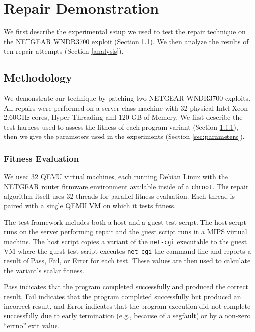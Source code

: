 \documentclass{sigcomm-alternate}
\begin{document}
{\section{Repair Demonstration}
\label{repair-demonstration}

We first describe the experimental setup we used to test the
repair technique on the NETGEAR WNDR3700 exploit (Section
\ref{methodology}).  We then analyze the results of ten repair
attempts (Section \ref{analysis}).

\subsection{Methodology}
\label{methodology}
We demonstrate our technique by patching two NETGEAR WNDR3700
exploits.  All repairs were performed on a server-class machine with
32 physical Intel Xeon 2.60GHz cores, Hyper-Threading and 120 GB of
Memory.  We first describe the test harness used to assess the fitness
of each program variant (Section
\ref{fitness-evaluation}), then we give the parameters used in the experiments
(Section \ref{sec:parameters}).

\subsubsection{Fitness Evaluation}
\label{fitness-evaluation}
We used 32 QEMU virtual machines, each
running Debian Linux with the NETGEAR router firmware environment
available inside of a \texttt{chroot}.  The repair algorithm itself
uses 32 threads for parallel fitness evaluation.  Each thread is
paired with a single QEMU VM on which it tests fitness.

The test framework includes both a host and a guest test script.  The
host script runs on the server performing repair and the guest script
runs in a MIPS virtual machine.  The host script copies a
variant of the \texttt{net-cgi} executable to the guest VM where the
guest test script executes \texttt{net-cgi} the command line and
reports a result of {\sc Pass}, {\sc Fail}, or {\sc Error} for each
test.  These values are then used to calculate the variant's scalar
fitness.

{\sc Pass} indicates that the program completed successfully and
produced the correct result, {\sc Fail} indicates that the program
completed successfully but produced an incorrect result, and {\sc
  Error} indicates that the program execution did not complete
successfully due to early termination (e.g., because of a segfault) or
by a non-zero ``errno'' exit value.

}
\end{document}
